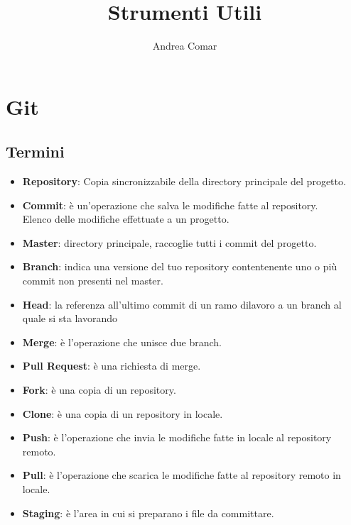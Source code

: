 \documentclass{article}
\title{Strumenti Utili}
\author{Andrea Comar}
\begin{document}
\maketitle
\section{Git}
\subsection{Termini}
\begin{itemize}
    \item \textbf{Repository}: Copia sincronizzabile della directory principale del progetto.
    \item \textbf{Commit}: è un'operazione che salva le modifiche fatte al repository. 
    \\
    Elenco delle modifiche effettuate a un progetto.
    \item \textbf{Master}: directory principale, raccoglie tutti i commit del progetto.
    \item \textbf{Branch}: indica una versione del tuo repository contentenente uno o più commit non presenti nel master.
    \item \textbf{Head}: la referenza all'ultimo commit di un ramo dilavoro a un branch al quale si sta lavorando
    \item \textbf{Merge}: è l'operazione che unisce due branch.
    \item \textbf{Pull Request}: è una richiesta di merge.
    \item \textbf{Fork}: è una copia di un repository.
    \item \textbf{Clone}: è una copia di un repository in locale.
    \item \textbf{Push}: è l'operazione che invia le modifiche fatte in locale al repository remoto.
    \item \textbf{Pull}: è l'operazione che scarica le modifiche fatte al repository remoto in locale.
    \item \textbf{Staging}: è l'area in cui si preparano i file da committare.
\end{itemize}
\end{document}
